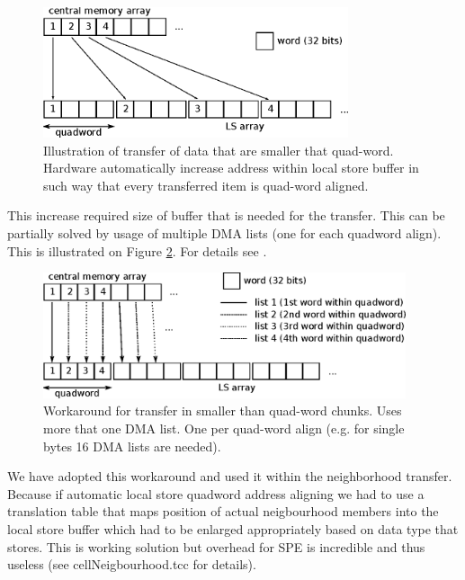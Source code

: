 \begin{figure}
    \centering
    \includegraphics[width=0.8\textwidth]{data/automaticAlignOfSmallData}
    \caption[automatic align of small data]
{
  Illustration of transfer of data that are smaller that quad-word.
  Hardware automatically increase address within local store buffer in such way that every transferred item is quad-word aligned.
}
    \label{fg:automaticAlignOfSmallData}
\end{figure}

This increase required size of buffer that is needed for the transfer.
This can be partially solved by usage of multiple DMA lists (one for each quadword align).
This is illustrated on Figure \ref{fg:multipleDMAList}.
For details see \cite{DMAListIssues}.

\begin{figure}
    \centering
    \includegraphics[width=0.95\textwidth]{data/multipleDMAList}
    \caption[multiple DMA list workaround]
{
  Workaround for transfer in smaller than quad-word chunks.
  Uses more that one DMA list.
  One per quad-word align (e.g. for single bytes 16 DMA lists are needed).
}
    \label{fg:multipleDMAList}
\end{figure}

We have adopted this workaround and used it within the neighborhood transfer.
Because if automatic local store quadword address aligning we had to use a translation table that maps position of actual neigbourhood members into the local store buffer which had to be enlarged appropriately based on data type that stores.
This is working solution but overhead for SPE is incredible and thus useless (see cellNeigbourhood.tcc for details).

